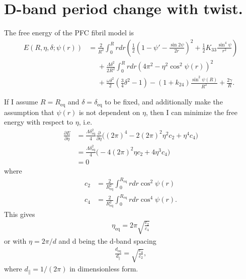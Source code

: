 \documentclass[12pt]{article}
\begin{document}


\section{D-band period change with twist.}
The free energy of the PFC fibril model is
\begin{align}\label{eq:finalE}
E(R,\eta,\delta;\psi(r))&=\frac{2}{R^2}\int_0^{R}rdr\left(\frac{1}{2}\left(1-\psi'-\frac{\sin2\psi}{2r}\right)^2+\frac{1}{2}K_{33}\frac{\sin^4\psi}{r^2}\right)\nonumber\\
&\phantom{=}+\frac{\Lambda\delta^2}{2R^2}\int_0^Rrdr\left(4\pi^2-\eta^2\cos^2\psi(r)\right)^2\nonumber\\
&\phantom{=}+\frac{\omega\delta^2}{2}\left(\frac{3}{4}\delta^2-1\right)-(1+k_{24})\frac{\sin^2\psi(R)}{R^2}+\frac{2\gamma}{R}.
\end{align}

If I assume $R=R_{\mathrm{eq}}$ and $\delta=\delta_{\mathrm{eq}}$ to be fixed, and additionally make the assumption that $\psi(r)$ is not dependent on $\eta$, then I can minimize the free energy with respect to $\eta$, i.e.
\begin{align}
\frac{\partial E}{\partial\eta} &= \frac{\Lambda\delta_{\mathrm{eq}}^2}{4}\frac{\partial}{\partial\eta}\bigg((2\pi)^4-2(2\pi)^2\eta^2c_2+\eta^4c_4\bigg)\nonumber\\
&=\frac{\Lambda\delta_{\mathrm{eq}}^2}{4}\bigg(-4(2\pi)^2\eta c_2+4\eta^3c_4\bigg)\nonumber\\
&=0
\end{align}
where
\begin{align}
c_2 &= \frac{2}{R_{\mathrm{eq}}^2}\int_0^{R_{\mathrm{eq}}}rdr\cos^2\psi(r)\\
c_4 &=\frac{2}{R_{\mathrm{eq}}^2}\int_0^{R_{\mathrm{eq}}}rdr\cos^4\psi(r).
\end{align}
This gives
\begin{align}
\eta_{\mathrm{eq}}=2\pi\sqrt{\frac{c_2}{c_4}}
\end{align}
or with $\eta = 2\pi/d$ and d being the d-band spacing 
\begin{align}
\frac{d_{\mathrm{eq}}}{d_{\parallel}}=\sqrt{\frac{c_4}{c_2}},
\end{align}
where $d_{\parallel}=1/(2\pi)$ in dimensionless form.
\end{document}
